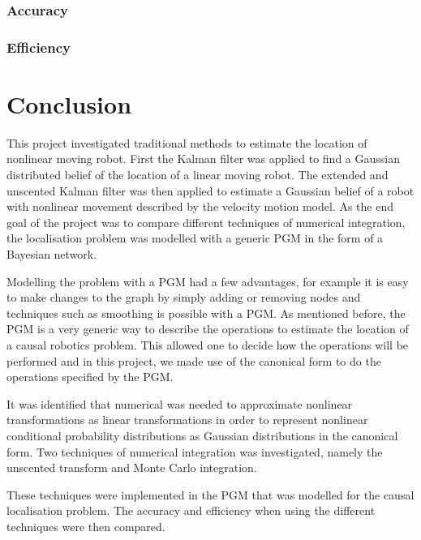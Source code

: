 \documentclass[12pt,oneside,openany,a4paper, %
afrikaans,english,
]{memoir}
\numberwithin{equation}{chapter}
\begin{document}
\subsection{Accuracy}
\subsection{Efficiency}

\chapter{Conclusion}
This project investigated traditional methods to estimate the location of nonlinear moving robot. First the Kalman filter was applied to find a Gaussian distributed belief of the location of a linear moving robot. The extended and unscented Kalman filter was then applied to estimate a Gaussian belief of a robot with nonlinear movement described by the velocity motion model. As the end goal of the project was to compare different techniques of numerical integration, the localisation problem was modelled with a generic PGM in the form of a Bayesian network.

Modelling the problem with a PGM had a few advantages, for example it is easy to make changes to the graph by simply adding or removing nodes and techniques such as smoothing is possible with a PGM. As mentioned before, the PGM is a very generic way to describe the operations to estimate the location of a causal robotics problem. This allowed one to decide how the operations will be performed and in this project, we made use of the canonical form to do the operations specified by the PGM.

It was identified that numerical was needed to approximate
nonlinear transformations as linear transformations in order to represent nonlinear conditional probability distributions as Gaussian distributions in the canonical form. Two techniques of numerical integration was investigated, namely the unscented transform and Monte Carlo integration.

These techniques were implemented in the PGM that was modelled for the causal localisation problem. The accuracy and efficiency when using the different techniques were then compared. 


\backmatter
{}
\end{document}
